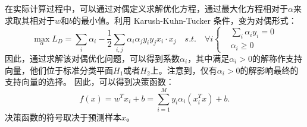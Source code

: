 在实际计算过程中，可以通过对偶定义求解优化方程，通过最大化方程相对于$\alpha$来求取其相对于$w$和$b$的最小值。利用 Karush-Kuhn-Tucker 条件，变为对偶形式：
\begin{equation}
	\max \limits_{\alpha} L_D=\sum_i{\alpha_i}-\frac{1}{2}\sum_{i,j}\alpha_i\alpha_jy_iy_jx_i\cdot x_j \quad s.t. \quad \forall i
	\left\{
		\begin{aligned}
	   &\sum_i{\alpha_iy_i}=0  \\
	   &\alpha_i \geq 0
	   \end{aligned}
		\right.
\end{equation}
因此，通过求解该对偶优化问题，可以得到系数$\alpha_i$，其中满足$\alpha_i>0$的解称作支持向量，他们位于标准分类平面$H_1$或者$H_2$上。注意到，仅有$\alpha_i>0$的解影响最终的支持向量的选择。
因此，可以得到决策函数：
\begin{equation}
	f(x)=w^Tx_i+b=\sum_{i=1}^My_i\alpha_i(x_i^Tx)+b.
\end{equation}
决策函数的符号取决于预测样本$x$。

